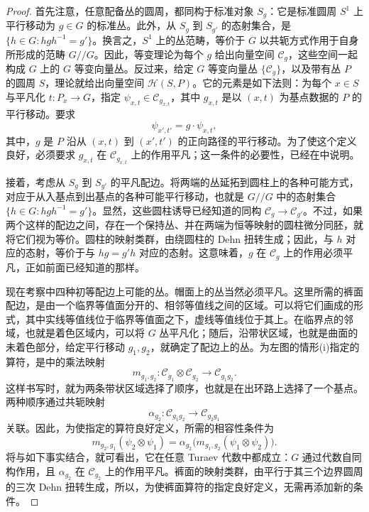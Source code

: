 \begin{proof}
首先注意，任意配备丛的圆周，都同构于标准对象 $S_g$：它是标准圆周 $S^1$ 上平行移动为 $g\in G$ 的标准丛。此外，从 $S_g$ 到 $S_{g'}$ 的态射集合，是 $\{h\in G:hgh^{-1}=g'\}$。换言之，$S^1$ 上的丛范畴，等价于 $G$ 以共轭方式作用于自身所形成的范畴 $G//G$。因此，等变理论为每个 $g$ 给出向量空间 $\mathcal{C}_g$，这些空间一起构成 $G$ 上的 $G$ 等变向量丛。反过来，给定 $G$ 等变向量丛 $\{\mathcal{C}_g\}$，以及带有丛 $P$ 的圆周 $S$，理论就给出向量空间 $\mathcal{H}(S,P)$。它的元素是如下法则：为每个 $x\in S$ 与平凡化 $t\colon P_x\to G$，指定 $\psi_{x,t}\in\mathcal{C}_{g_{x,t}}$，其中 $g_{x,t}$ 是以 $(x,t)$ 为基点数据的 $P$ 的平行移动。要求
\[
\psi_{x',t'}=g\cdot\psi_{x,t},
\]
其中，$g$ 是 $P$ 沿从 $(x,t)$ 到 $(x',t')$ 的正向路径的平行移动。为了使这个定义良好，必须要求 $g_{x,t}$ 在 $\mathcal{C}_{g_{x,t}}$ 上的作用平凡；这一条件的必要性，已经在中说明。

接着，考虑从 $S_g$ 到 $S_{g'}$ 的平凡配边。将两端的丛延拓到圆柱上的各种可能方式，对应于从入基点到出基点的各种可能平行移动，也就是 $G//G$ 中的态射集合 $\{h\in G:hgh^{-1}=g'\}$。显然，这些圆柱诱导已经知道的同构 $\mathcal{C}_g\to\mathcal{C}_{g'}$。不过，如果两个这样的配边之间，存在一个保持丛、并在两端为恒等映射的圆柱微分同胚，就将它们视为等价。圆柱的映射类群，由绕圆柱的 Dehn 扭转生成；因此，与 $h$ 对应的态射，等价于与 $hg=g'h$ 对应的态射。这意味着，$g$ 在 $\mathcal{C}_g$ 上的作用必须平凡，正如前面已经知道的那样。

现在考察中四种初等配边上可能的丛。帽面上的丛当然必须平凡。这里所需的裤面配边，是由一个临界等值面分开的、相邻等值线之间的区域。可以将它们画成的形式，其中实线等值线位于临界等值面之下，虚线等值线位于其上。在临界点的邻域，也就是着色区域内，可以将 $G$ 丛平凡化；随后，沿带状区域，也就是曲面的未着色部分，给定平行移动 $g_1,g_2$，就确定了配边上的丛。为左图的情形(i)指定的算符，是中的乘法映射
\[
m_{g_1,g_2}\colon\mathcal{C}_{g_1}\otimes\mathcal{C}_{g_2}\longrightarrow\mathcal{C}_{g_1g_2}.
\]
这样书写时，就为两条带状区域选择了顺序，也就是在出环路上选择了一个基点。两种顺序通过共轭映射
\[
\alpha_{g_2}\colon\mathcal{C}_{g_1g_2}\longrightarrow\mathcal{C}_{g_2g_1}
\]
关联。因此，为使指定的算符良好定义，所需的相容性条件为
\[
m_{g_2,g_1}(\psi_2\otimes\psi_1)
=\alpha_{g_2}\bigl(m_{g_1,g_2}(\psi_1\otimes\psi_2)\bigr).
\]
将与如下事实结合，就可看出，它在任意 Turaev 代数中都成立：$G$ 通过代数自同构作用，且 $\alpha_{g_2}$ 在 $\mathcal{C}_{g_2}$ 上的作用平凡。裤面的映射类群，由平行于其三个边界圆周的三次 Dehn 扭转生成，所以，为使裤面算符的指定良好定义，无需再添加新的条件。


\end{proof}

